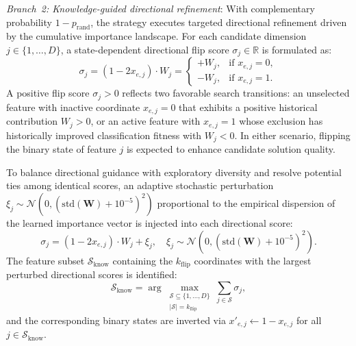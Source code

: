 \textit{Branch~2: Knowledge-guided directional refinement}: With complementary probability $1 - p_{\mathrm{rand}}$, the strategy executes targeted directional refinement driven by the cumulative importance landscape. For each candidate dimension $j \in \{1, \dots, D\}$, a state-dependent directional flip score $\sigma_j \in \mathbb{R}$ is formulated as:
\begin{equation}
\sigma_j = (1 - 2 x_{e,j}) \cdot W_j = \begin{cases}
+W_j, & \text{if } x_{e,j} = 0, \\[2pt]
-W_j, & \text{if } x_{e,j} = 1.
\end{cases}
\label{eq:flip_score}
\end{equation}
A positive flip score $\sigma_j > 0$ reflects two favorable search transitions: an unselected feature with inactive coordinate $x_{e,j} = 0$ that exhibits a positive historical contribution $W_j > 0$, or an active feature with $x_{e,j} = 1$ whose exclusion has historically improved classification fitness with $W_j < 0$. In either scenario, flipping the binary state of feature $j$ is expected to enhance candidate solution quality.

To balance directional guidance with exploratory diversity and resolve potential ties among identical scores, an adaptive stochastic perturbation $\xi_j \sim \mathcal{N}\left(0, (\mathrm{std}(\mathbf{W}) + 10^{-5})^2\right)$ proportional to the empirical dispersion of the learned importance vector is injected into each directional score:
\begin{equation}
\sigma_j = (1 - 2 x_{e,j}) \cdot W_j + \xi_j, \quad \xi_j \sim \mathcal{N}\left(0, \left(\mathrm{std}(\mathbf{W}) + 10^{-5}\right)^2\right).
\label{eq:perturbed_score}
\end{equation}
The feature subset $\mathcal{S}_{\mathrm{know}}$ containing the $k_{\mathrm{flip}}$ coordinates with the largest perturbed directional scores is identified:
\begin{equation}
\mathcal{S}_{\mathrm{know}} = \arg\max_{\substack{\mathcal{S} \subseteq \{1, \dots, D\} \\ |\mathcal{S}| = k_{\mathrm{flip}}}} \sum_{j \in \mathcal{S}} \sigma_j,
\label{eq:top_scores}
\end{equation}
and the corresponding binary states are inverted via $x'_{e,j} \leftarrow 1 - x_{e,j}$ for all $j \in \mathcal{S}_{\mathrm{know}}$.


